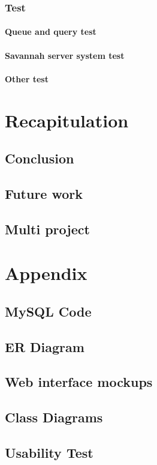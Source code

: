     \subsection{Test}
	
        \subsubsection{Queue and query test}
	
	\subsubsection{Savannah server system test}
	
	\subsubsection{Other test}

\chapter{Recapitulation}
  \section{Conclusion}
  \section{Future work}
  \section{Multi project} %

\appendix
	\chapter{Appendix}
	\section{MySQL Code}
	\label{MySQLcode}
		
	\section{ER Diagram}
	\label{errDiagram}
		
	\section{Web interface mockups}
		
		\label{app:Mock}
	\section{Class Diagrams}
	\label{app:Class-diagrams}
		
        
   \section{Usability Test}
   	
   		\label{app:quest}



\appendix


